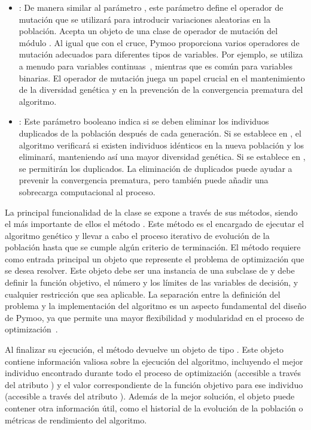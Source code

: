 \begin{itemize}
    \item \texttt{}: De manera similar al parámetro \texttt{}, este parámetro define el operador de mutación que se utilizará para introducir variaciones aleatorias en la población. Acepta un objeto de una clase de operador de mutación del módulo \texttt{}. Al igual que con el cruce, Pymoo proporciona varios operadores de mutación adecuados para diferentes tipos de variables. Por ejemplo, \texttt{} se utiliza a menudo para variables continuas~\cite{deb1996}, mientras que \texttt{} es común para variables binarias. El operador de mutación juega un papel crucial en el mantenimiento de la diversidad genética y en la prevención de la convergencia prematura del algoritmo.
    \item \texttt{}: Este parámetro booleano indica si se deben eliminar los individuos duplicados de la población después de cada generación. Si se establece en \texttt{}, el algoritmo verificará si existen individuos idénticos en la nueva población y los eliminará, manteniendo así una mayor diversidad genética. Si se establece en \texttt{}, se permitirán los duplicados. La eliminación de duplicados puede ayudar a prevenir la convergencia prematura, pero también puede añadir una sobrecarga computacional al proceso.
\end{itemize}

La principal funcionalidad de la clase \texttt{} se expone a través de sus métodos, siendo el más importante de ellos el método \texttt{}. Este método es el encargado de ejecutar el algoritmo genético y llevar a cabo el proceso iterativo de evolución de la población hasta que se cumple algún criterio de terminación. El método \texttt{} requiere como entrada principal un objeto que represente el problema de optimización que se desea resolver. Este objeto debe ser una instancia de una subclase de \texttt{} y debe definir la función objetivo, el número y los límites de las variables de decisión, y cualquier restricción que sea aplicable. La separación entre la definición del problema y la implementación del algoritmo es un aspecto fundamental del diseño de Pymoo, ya que permite una mayor flexibilidad y modularidad en el proceso de optimización~\cite{blank2020}.

Al finalizar su ejecución, el método \texttt{} devuelve un objeto de tipo \texttt{}. Este objeto contiene información valiosa sobre la ejecución del algoritmo, incluyendo el mejor individuo encontrado durante todo el proceso de optimización (accesible a través del atributo \texttt{}) y el valor correspondiente de la función objetivo para ese individuo (accesible a través del atributo \texttt{}). Además de la mejor solución, el objeto \texttt{} puede contener otra información útil, como el historial de la evolución de la población o métricas de rendimiento del algoritmo.

